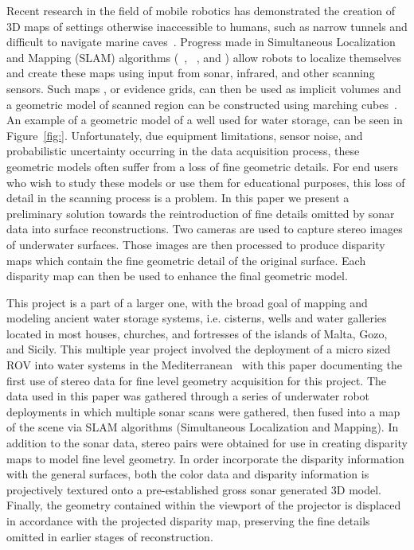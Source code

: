 \documentclass[a4paper,twoside]{article}
\begin{document}

\noindent Recent research in the field of mobile robotics has demonstrated the creation of 3D maps of settings otherwise inaccessible to humans, such as narrow tunnels and difficult to navigate marine caves~\cite{ICEX11,McVicker,McVicker2}. Progress made in Simultaneous Localization and Mapping (SLAM) algorithms  (~\cite{Williams2000}, ~\cite{harbor}, and \cite{Fairfield2005,Fairfield2006}) allow robots to localize themselves and create these maps using input from sonar, infrared, and other scanning sensors.  Such maps , or evidence grids, can then be used as implicit volumes and a geometric model of scanned region can be constructed using marching cubes~\cite{Lorensen}.  An example of a geometric model of a well used for water storage, can be seen in Figure~\ref{fig:}.
 Unfortunately, due equipment limitations, sensor noise, and probabilistic uncertainty occurring in the  data acquisition process, these geometric models often suffer from a loss of fine geometric details.  For end users who wish to study these models or use them for educational purposes, this loss of detail in the scanning process is a problem.  
In this paper we present a preliminary solution towards the reintroduction of fine details omitted by sonar data into surface reconstructions.  
Two cameras are used to capture stereo images of underwater surfaces.
Those images are then processed to produce disparity maps which contain the fine geometric detail of the original surface.
Each disparity map can then be used to enhance the final geometric model.

This project is a part of a larger one, with the broad goal of mapping and modeling ancient water storage systems, i.e. cisterns, wells and water galleries located in most houses, churches, and fortresses of the islands of Malta, Gozo, and Sicily. This multiple year project involved the deployment of a micro sized ROV into water systems in the Mediterranean~\cite{White10,ICEX11,McVicker,McVicker2} with this paper documenting the first use of stereo data for fine level geometry acquisition for this project.  The data used in this paper was gathered through a series of underwater robot deployments in which multiple sonar scans were gathered, then fused into a map of the scene via SLAM algorithms (Simultaneous Localization and Mapping). In addition to the sonar data, stereo pairs were obtained for use in creating disparity maps to model fine level geometry.  In order incorporate the disparity information with the general surfaces, both the color data and disparity information is projectively textured onto a pre-established gross sonar generated 3D model. Finally, the geometry contained within the viewport of the projector is displaced in accordance with the projected disparity map, preserving the fine details omitted in earlier stages of reconstruction.
\end{document}
